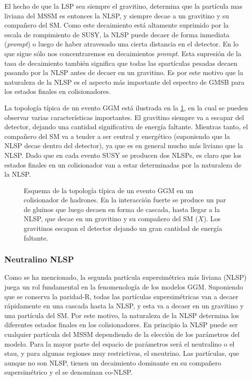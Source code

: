 El hecho de que la LSP sea siempre el gravitino, determina que la partícula mas
liviana del MSSM es entonces la NLSP, y siempre decae a un gravitino y su
compañero del SM. Como este decaimiento está altamente suprimido por la escala
de rompimiento de SUSY, la NLSP puede decaer de forma inmediata (\emph{prompt})
o luego de haber atravesado una cierta distancia en el detector. En lo que sigue
sólo nos concentraremos en decaimientos \emph{prompt}. Esta supresión de la tasa
de decaimiento también significa que todas las spartículas pesadas decaen
pasando por la NLSP antes de decaer en un gravitino. Es por este motivo que la
naturaleza de la NLSP es el aspecto más importante del espectro de GMSB para los
estados finales en colisionadores.

La topología típica de un evento GGM está ilustrada en la \cref{fig:ggm_event},
en la cual se pueden observar varias características importantes. El gravitino
siempre va a escapar del detector, dejando una cantidad significativa de energía
faltante. Mientras tanto, el compañero del SM va a tender a ser central y
energético (suponiendo que la NLSP decae dentro del detector), ya que es en
general mucho más liviano que la NLSP. Dado que en cada evento SUSY se producen
dos NLSPs, es claro que los estados finales en un colisionador van a estar
determinadas por la naturaleza de la NLSP.


\begin{figure}[!htbp]
  \centering

  

  \caption{Esquema de la topología típica de un evento GGM en un colisionador de
    hadrones. En la interacción fuerte se produce un par de gluinos que luego
    decaen en forma de cascada, hasta llegar a la NLSP, que decae en un
    gravitino {\gravino} y su compañero del SM ($X$). Los gravitinos escapan el
    detector dejando un gran cantidad de energía faltante.}
  \label{fig:ggm_event}
\end{figure}


\subsubsection{Neutralino NLSP}

Como se ha mencionado, la segunda partícula supersimétrica más liviana (NLSP)
juega un rol fundamental en la fenomenología de los modelos GGM. Suponiendo que
se conserva la paridad-R, todas las partículas supersimétricas van a decaer
rápidamente en una cascada hasta la NLSP, y esta va a decaer en un gravitino y
una partícula del SM. Por este motivo, la naturaleza de la NLSP determina los
diferentes estados finales en los colisionadores. En principio la NLSP puede ser
cualquier partícula del MSSM dependiendo de la elección de los parámetros del
modelo. Para la mayor parte del espacio de parámetros será el neutralino o el
stau, y para algunas regiones muy restrictivas, el
sneutrino\cite{arxiv:9801271}. Las partículas, que aunque no son NLSP, tienen un
decaimiento dominante en su compañero supersimétrico y el {\gravino} se
denominan co-NLSP.

